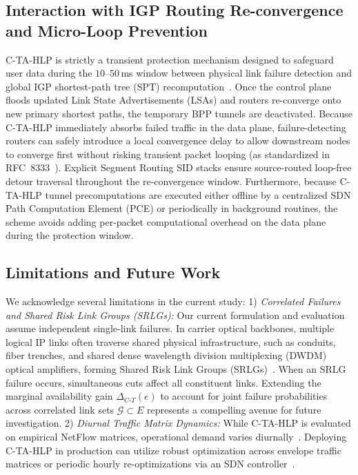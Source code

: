 \documentclass[journal]{IEEEtran}
\begin{document}
\subsection{Interaction with IGP Routing Re-convergence and Micro-Loop Prevention}
C-TA-HLP is strictly a transient protection mechanism designed to safeguard user data during the $10\text{--}50$\,ms window between physical link failure detection and global IGP shortest-path tree (SPT) recomputation~\cite{francois2005achieving}. Once the control plane floods updated Link State Advertisements (LSAs) and routers re-converge onto new primary shortest paths, the temporary BPP tunnels are deactivated. Because C-TA-HLP immediately absorbs failed traffic in the data plane, failure-detecting routers can safely introduce a local convergence delay to allow downstream nodes to converge first without risking transient packet looping (as standardized in RFC~8333~\cite{rfc8333}). Explicit Segment Routing SID stacks ensure source-routed loop-free detour traversal throughout the re-convergence window. Furthermore, because C-TA-HLP tunnel precomputations are executed either offline by a centralized SDN Path Computation Element (PCE) or periodically in background routines, the scheme avoids adding per-packet computational overhead on the data plane during the protection window.

\subsection{Limitations and Future Work}
We acknowledge several limitations in the current study:
1) \textit{Correlated Failures and Shared Risk Link Groups (SRLGs):} Our current formulation and evaluation assume independent single-link failures. In carrier optical backbones, multiple logical IP links often traverse shared physical infrastructure, such as conduits, fiber trenches, and shared dense wavelength division multiplexing (DWDM) optical amplifiers, forming Shared Risk Link Groups (SRLGs)~\cite{li2012unified,ergenc2021service}. When an SRLG failure occurs, simultaneous cuts affect all constituent links. Extending the marginal availability gain $\Delta_{C\text{-}T}(e)$ to account for joint failure probabilities across correlated link sets $\mathcal{G} \subset E$ represents a compelling avenue for future investigation.
2) \textit{Diurnal Traffic Matrix Dynamics:} While C-TA-HLP is evaluated on empirical NetFlow matrices, operational demand varies diurnally~\cite{roughan2003traffic,medina2002traffic}. Deploying C-TA-HLP in production can utilize robust optimization across envelope traffic matrices or periodic hourly re-optimizations via an SDN controller~\cite{polverini2018routing}.
\end{document}
